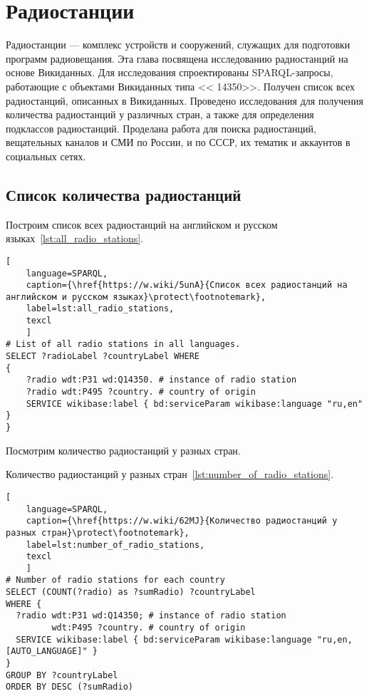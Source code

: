 \chapter[Радиостанции]{Радиостанции}
\label{ch:radio-station}

Радиостанции — комплекс устройств и сооружений, служащих для подготовки программ радиовещания. Эта глава посвящена исследованию радиостанций на основе Викиданных. Для исследования спроектированы SPARQL-запросы, работающие с объектами Викиданных типа << {14350}>>. Получен список всех радиостанций, описанных в Викиданных. Проведено исследования для получения количества радиостанций у различных стран, а также для определения подклассов радиостанций. Проделана работа для поиска радиостанций, вещательных каналов и СМИ по России, и по СССР, их тематик и аккаунтов в социальных сетях.


\section{Список количества радиостанций}

Построим список всех радиостанций на английском и русском языках~\ref{lst:all_radio_stations}.
\begin{lstlisting}[ 
    language=SPARQL,
    caption={\href{https://w.wiki/5unA}{Cписок всех радиостанций на английском и русском языках}\protect\footnotemark},
    label=lst:all_radio_stations,
    texcl
    ]
# List of all radio stations in all languages.
SELECT ?radioLabel ?countryLabel WHERE
{
    ?radio wdt:P31 wd:Q14350. # instance of radio station
    ?radio wdt:P495 ?country. # country of origin
    SERVICE wikibase:label { bd:serviceParam wikibase:language "ru,en" }
}
\end{lstlisting}%

\newpage

Посмотрим количество радиостанций у разных стран.

Количество радиостанций у разных стран~\ref{lst:number_of_radio_stations}.

\begin{lstlisting}[ 
    language=SPARQL,
    caption={\href{https://w.wiki/62MJ}{Количество радиостанций у разных стран}\protect\footnotemark},
    label=lst:number_of_radio_stations,
    texcl
    ]
# Number of radio stations for each country
SELECT (COUNT(?radio) as ?sumRadio) ?countryLabel
WHERE {
  ?radio wdt:P31 wd:Q14350; # instance of radio station
         wdt:P495 ?country. # country of origin
  SERVICE wikibase:label { bd:serviceParam wikibase:language "ru,en,[AUTO_LANGUAGE]" }
}
GROUP BY ?countryLabel
ORDER BY DESC (?sumRadio)
\end{lstlisting}%

